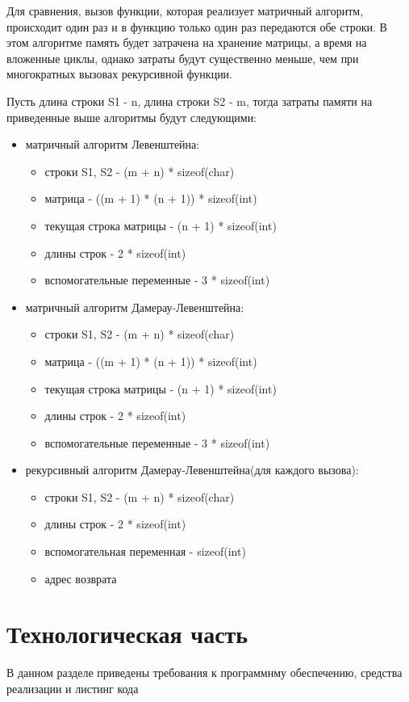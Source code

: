 \documentclass[a4paper,12pt]{report}
\begin{document}
Для сравнения, вызов функции, которая реализует матричный алгоритм, происходит один раз и в функцию только один раз передаются обе строки. В этом алгоритме память будет затрачена на хранение матрицы, а время на вложенные циклы, однако затраты будут существенно меньше, чем при многократных вызовах рекурсивной функции.
	
Пусть длина строки S1 - n, длина строки S2 - m, тогда затраты памяти на приведенные выше алгоритмы будут следующими:
\begin{itemize}
\item матричный алгоритм Левенштейна:\begin{itemize}
	\item строки S1, S2 - (m + n) * sizeof(char)
	\item матрица - ((m + 1) * (n + 1)) * sizeof(int)
	\item текущая строка матрицы - (n + 1) * sizeof(int)
	\item длины строк - 2 * sizeof(int)
	\item вспомогательные переменные -  3 * sizeof(int)
	\end{itemize}
\item матричный алгоритм Дамерау-Левенштейна:\begin{itemize}
	\item строки S1, S2 - (m + n) * sizeof(char)
	\item матрица - ((m + 1) * (n + 1)) * sizeof(int)
	\item текущая строка матрицы - (n + 1) * sizeof(int)
	\item длины строк - 2 * sizeof(int)
	\item вспомогательные переменные -  3 * sizeof(int)
	\end{itemize}
\newpage
\item рекурсивный алгоритм Дамерау-Левенштейна(для каждого вызова):\begin{itemize}
	\item строки S1, S2 - (m + n) * sizeof(char)
	\item длины строк - 2 * sizeof(int)
	\item вспомогательная переменная -  sizeof(int)
	\item адрес возврата
	\end{itemize}
\end{itemize}

\chapter{Технологическая часть}
В данном разделе приведены требования к программнму обеспечению, средства реализации и листинг кода
\end{document}
